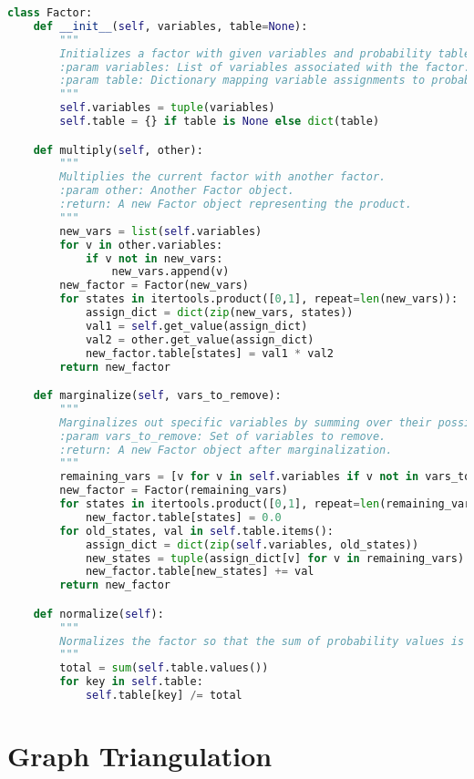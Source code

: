 \begin{lstlisting}[language=Python]
class Factor:
    def __init__(self, variables, table=None):
        """
        Initializes a factor with given variables and probability table.
        :param variables: List of variables associated with the factor.
        :param table: Dictionary mapping variable assignments to probability values.
        """
        self.variables = tuple(variables)
        self.table = {} if table is None else dict(table)

    def multiply(self, other):
        """
        Multiplies the current factor with another factor.
        :param other: Another Factor object.
        :return: A new Factor object representing the product.
        """
        new_vars = list(self.variables)
        for v in other.variables:
            if v not in new_vars:
                new_vars.append(v)
        new_factor = Factor(new_vars)
        for states in itertools.product([0,1], repeat=len(new_vars)):
            assign_dict = dict(zip(new_vars, states))
            val1 = self.get_value(assign_dict)
            val2 = other.get_value(assign_dict)
            new_factor.table[states] = val1 * val2
        return new_factor

    def marginalize(self, vars_to_remove):
        """
        Marginalizes out specific variables by summing over their possible values.
        :param vars_to_remove: Set of variables to remove.
        :return: A new Factor object after marginalization.
        """
        remaining_vars = [v for v in self.variables if v not in vars_to_remove]
        new_factor = Factor(remaining_vars)
        for states in itertools.product([0,1], repeat=len(remaining_vars)):
            new_factor.table[states] = 0.0
        for old_states, val in self.table.items():
            assign_dict = dict(zip(self.variables, old_states))
            new_states = tuple(assign_dict[v] for v in remaining_vars)
            new_factor.table[new_states] += val
        return new_factor

    def normalize(self):
        """
        Normalizes the factor so that the sum of probability values is equal to 1.
        """
        total = sum(self.table.values())
        for key in self.table:
            self.table[key] /= total
\end{lstlisting}

\section{Graph Triangulation}

